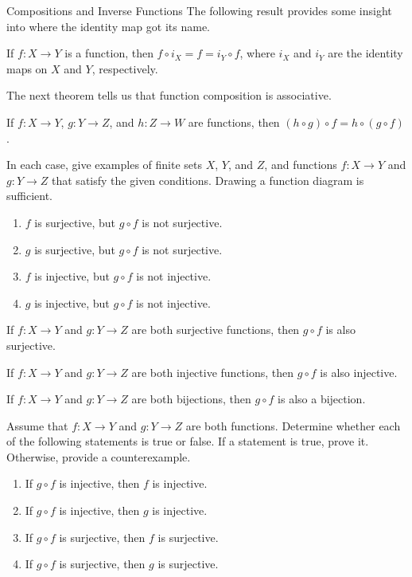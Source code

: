 \begin{section}{Compositions and Inverse Functions}
The following result provides some insight into where the identity map got its name.  

\begin{theorem}
If $f:X\to Y$ is a function, then $f\circ i_X = f = i_Y\circ f$, where $i_X$ and $i_Y$ are the identity maps on $X$ and $Y$, respectively.
\end{theorem}

The next theorem tells us that function composition is associative.

\begin{theorem}
If $f:X\to Y$, $g:Y\to Z$, and $h:Z\to W$ are functions, then $(h\circ g)\circ f = h\circ (g\circ f)$.
\end{theorem}

\begin{problem}
In each case, give examples of finite sets $X$, $Y$, and $Z$, and functions $f:X\to Y$ and $g:Y\to Z$ that satisfy the given conditions.  Drawing a function diagram is sufficient.
\begin{enumerate}[label=\textrm{(\alph*)}]
\item $f$ is surjective, but $g\circ f$ is not surjective.
\item $g$ is surjective, but $g\circ f$ is not surjective.
\item $f$ is injective, but $g\circ f$ is not injective.
\item $g$ is injective, but $g\circ f$ is not injective.
\end{enumerate}
\end{problem}

\begin{theorem}
If $f:X\to Y$ and $g:Y\to Z$ are both surjective functions, then $g\circ f$ is also surjective.
\end{theorem}

\begin{theorem}
If $f:X\to Y$ and $g:Y\to Z$ are both injective functions, then $g\circ f$ is also injective.
\end{theorem}

\begin{corollary}
If $f:X\to Y$ and $g:Y\to Z$ are both bijections, then $g\circ f$ is also a bijection.
\end{corollary}

\begin{problem}
Assume that $f:X\to Y$ and $g:Y\to Z$ are both functions.  Determine whether each of the following statements is true or false. If a statement is true, prove it.  Otherwise, provide a counterexample.
\begin{enumerate}[label=\textrm{(\alph*)}]
\item If $g\circ f$ is injective, then $f$ is injective.
\item If $g\circ f$ is injective, then $g$ is injective.
\item If $g\circ f$ is surjective, then $f$ is surjective.
\item If $g\circ f$ is surjective, then $g$ is surjective.
\end{enumerate}
\end{problem}


\end{section}
